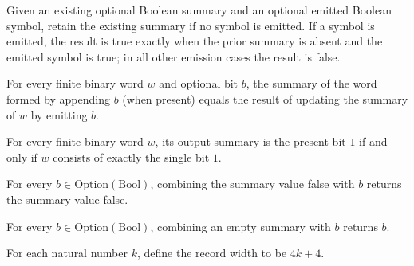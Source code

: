\begin{definition}
\label{Turing.StepBlock.summaryEmit}
\leanok
Given an existing optional Boolean summary and an optional emitted Boolean symbol,
retain the existing summary if no symbol is emitted. If a symbol is emitted, the result
is true exactly when the prior summary is absent and the emitted symbol is true; in all
other emission cases the result is false.
\end{definition}

\begin{lemma}
\label{Turing.StepBlock.outputSummary_append}
\leanok
{}
For every finite binary word $w$ and optional bit $b$, the summary of the word formed by
appending $b$ (when present) equals the result of updating the summary of $w$ by
emitting $b$.
\end{lemma}

\begin{lemma}
\label{Turing.StepBlock.outputSummary_true}
\leanok
{}
For every finite binary word $w$, its output summary is the present bit $1$ if and only
if $w$ consists of exactly the single bit $1$.
\end{lemma}

\begin{lemma}
\label{Turing.StepBlock.summaryEmit_other}
\leanok
{}
For every $b\in\mathrm{Option}(\mathrm{Bool})$, combining the summary value false with
$b$ returns the summary value false.
\end{lemma}

\begin{lemma}
\label{Turing.StepBlock.summaryEmit_none}
\leanok
{}
For every $b\in\mathrm{Option}(\mathrm{Bool})$, combining an empty summary with $b$
returns $b$.
\end{lemma}

\begin{definition}
\label{Turing.StepBlock.recordWidth}
\leanok
For each natural number $k$, define the record width to be $4k+4$.
\end{definition}

